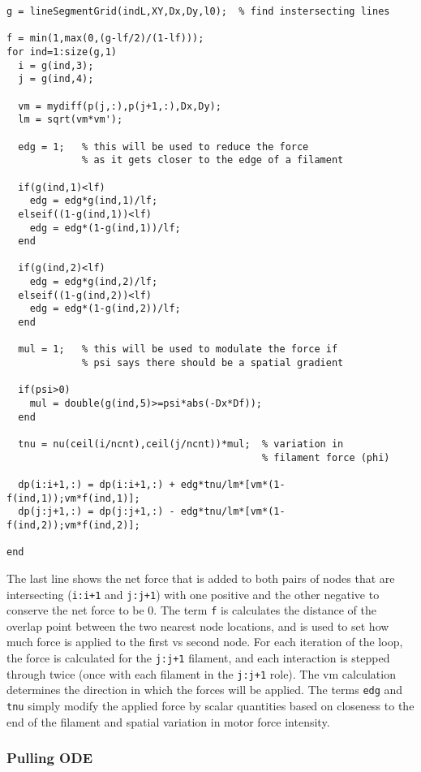\begin{verbatim}
g = lineSegmentGrid(indL,XY,Dx,Dy,l0);  % find instersecting lines

f = min(1,max(0,(g-lf/2)/(1-lf)));
for ind=1:size(g,1)
  i = g(ind,3);
  j = g(ind,4);

  vm = mydiff(p(j,:),p(j+1,:),Dx,Dy);
  lm = sqrt(vm*vm');

  edg = 1;   % this will be used to reduce the force 
			 % as it gets closer to the edge of a filament

  if(g(ind,1)<lf)
    edg = edg*g(ind,1)/lf;
  elseif((1-g(ind,1))<lf)
    edg = edg*(1-g(ind,1))/lf;
  end

  if(g(ind,2)<lf)
    edg = edg*g(ind,2)/lf;
  elseif((1-g(ind,2))<lf)
    edg = edg*(1-g(ind,2))/lf;
  end
  
  mul = 1;   % this will be used to modulate the force if
             % psi says there should be a spatial gradient
  
  if(psi>0)
    mul = double(g(ind,5)>=psi*abs(-Dx*Df));
  end
  
  tnu = nu(ceil(i/ncnt),ceil(j/ncnt))*mul;  % variation in 
											% filament force (phi)
  
  dp(i:i+1,:) = dp(i:i+1,:) + edg*tnu/lm*[vm*(1-f(ind,1));vm*f(ind,1)];
  dp(j:j+1,:) = dp(j:j+1,:) - edg*tnu/lm*[vm*(1-f(ind,2));vm*f(ind,2)];

end
\end{verbatim}

The last line shows the net force that is added to both pairs of nodes that are intersecting (\texttt{i:i+1} and \texttt{j:j+1}) with one positive and the other negative to conserve the net force to be 0.  The term \texttt{f} is calculates the distance of the overlap point between the two nearest node locations, and is used to set how much force is applied to the first vs second node.  For each iteration of the loop, the force is calculated for the \texttt{j:j+1} filament, and each interaction is stepped through twice (once with each filament in the \texttt{j:j+1} role).  The vm calculation determines the direction in which the forces will be applied.  The terms \texttt{edg} and \texttt{tnu} simply modify the applied force by scalar quantities based on closeness to the end of the filament and spatial variation in motor force intensity.



\subsubsection{Pulling ODE}

